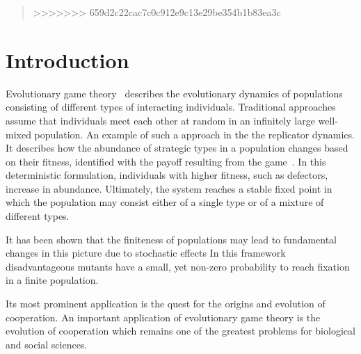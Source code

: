 \documentclass[11pt]{article}
\theoremstyle{plainCl1}
\theoremstyle{plainCl2}
\begin{document}
\begin{abstract}
>>>>>>> 659d2c22cac7c0c912e9c13e29be354b1b83ea3c
\end{abstract}

\section{Introduction}

Evolutionary game theory~\cite{smith1982evolution, hofbauer1998evolutionary,
nowak2004evolutionary, hauert2005game} describes the evolutionary dynamics of
populations consisting of different types of interacting individuals.
Traditional approaches assume that individuals meet each other at random in an
infinitely large well-mixed population. An example of such a approach in the the
replicator dynamics. It describes how the abundance of strategic types in a
population changes based on their fitness, identified with the payoff resulting
from the game~\cite{cressman2014replicator}. In this deterministic formulation,
individuals with higher fitness, such as defectors, increase in abundance.
Ultimately, the system reaches a stable fixed point in which the population may
consist either of a single type or of a mixture of different types.

It has been shown that the finiteness of populations may lead to fundamental
changes in this picture due to stochastic effects In this framework
disadvantageous mutants have a small, yet non-zero probability to reach fixation
in a finite population.


Its most prominent application is the quest for the origins and 
evolution of cooperation.
An important application of evolutionary game theory is the evolution of
cooperation which remains one of the greatest problems for biological and social
sciences.
\end{document}
